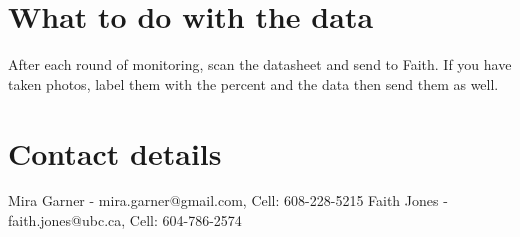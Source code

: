 \documentclass[11pt,letter]{article}
\begin{document}
\section{What to do with the data}
After each round of monitoring, scan the datasheet and send to Faith. If you have taken photos, label them with the percent and the data then send them as well.

\section{Contact details}
Mira Garner - mira.garner@gmail.com, Cell: 608-228-5215
Faith Jones - faith.jones@ubc.ca, Cell: 604-786-2574
\end{document}
